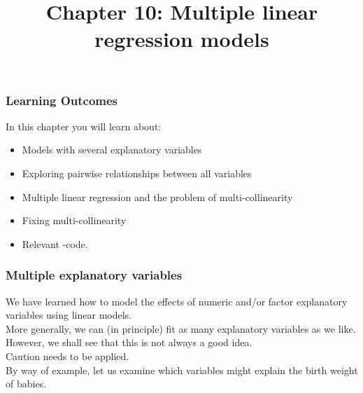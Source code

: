 \documentclass{beamer}\usepackage[]{graphicx}\usepackage[]{xcolor}
\begin{document}
\newcommand{\thechapter}{10}

\title{Chapter 10: Multiple linear regression models}


\begin{frame}
\titlepage
\end{frame}


\begin{frame}[t]
\frametitle{Learning Outcomes}
In this chapter you will learn about:
\begin{center}
\vspace{16pt}
\begin{minipage}{0.9\textwidth}
  \begin{itemize}
  \item Models with several explanatory variables
  \item Exploring pairwise relationships between all variables
  \item Multiple linear regression and the problem of multi-collinearity
  \item Fixing multi-collinearity
  \item Relevant -code.
  \end{itemize}
\end{minipage}
\end{center}

\end{frame}




\begin{frame}
  \frametitle{Multiple explanatory variables }
  We have learned how to model the effects of numeric and/or factor explanatory variables using linear models.\\
  \bigskip
  More generally, we can (in principle) fit as many explanatory variables as we like. However, we shall see that this is not always a good idea.\\
  \bigskip
  Caution needs to be applied.\\
  \bigskip
  By way of example, let us examine which variables might explain the birth weight of babies.\\
\end{frame}
\end{document}
